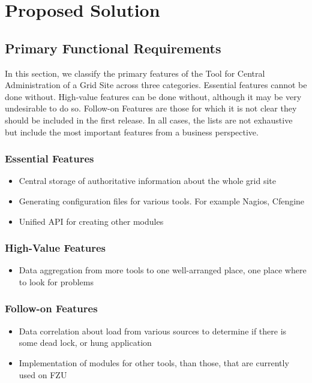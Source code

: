 \documentclass[12pt]{article}
\begin{document}
\section{Proposed Solution}

\subsection{Primary Functional Requirements}
In this section, we classify the primary features of the Tool for Central Administration of a Grid Site across three categories. 
Essential features cannot be done without. High-value features can be done without, although it may be very undesirable to do so. 
Follow-on Features are those for which it is not clear they should be included in the first release. In all cases, the lists are not 
exhaustive but include the most important features from a business perspective.

\subsubsection{Essential Features}
\begin{itemize}
	\item Central storage of authoritative information about the whole grid site
	\item Generating configuration files for various tools. For example Nagios, Cfengine
	\item Unified API for creating other modules
\end{itemize}

\subsubsection{High-Value Features}
\begin{itemize}
	\item Data aggregation from more tools to one well-arranged place, one place where to look for problems
\end{itemize}

\subsubsection{Follow-on Features}
\begin{itemize}
	\item Data correlation about load from various sources to determine if there is some dead lock, or hung application
	\item Implementation of modules for other tools, than those, that are currently used on FZU
\end{itemize}
\end{document}
